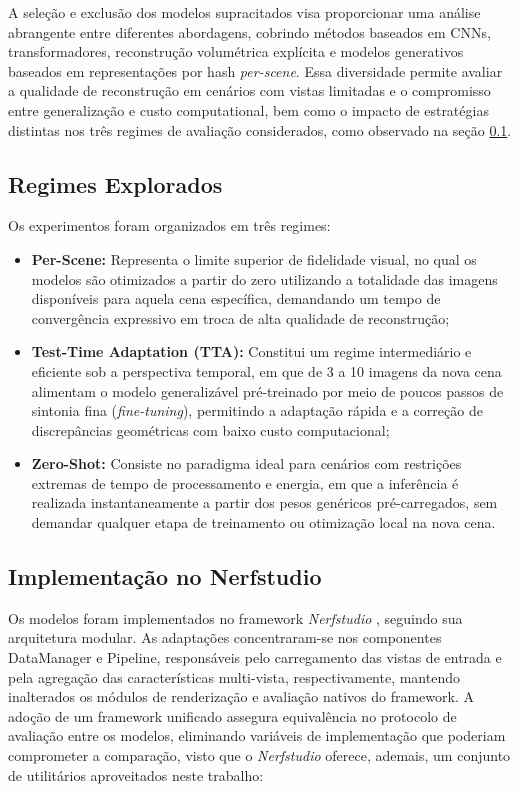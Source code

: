 \documentclass[12pt]{article}
\begin{document}
A seleção e exclusão dos modelos supracitados visa proporcionar uma análise abrangente entre diferentes abordagens, cobrindo métodos baseados em CNNs, transformadores, reconstrução volumétrica explícita e modelos generativos baseados em representações por hash \textit{per-scene}. Essa diversidade permite avaliar a qualidade de reconstrução em cenários com vistas limitadas e o compromisso entre generalização e custo computational, bem como o impacto de estratégias distintas nos três regimes de avaliação considerados, como observado na seção \ref{sec:reg}.

\subsection{Regimes Explorados}
\label{sec:reg}

Os experimentos foram organizados em três regimes: 
\begin{itemize}
  \item \textbf{Per-Scene:} Representa o limite superior de fidelidade visual, no qual os modelos são otimizados a partir do zero utilizando a totalidade das imagens disponíveis para aquela cena específica, demandando um tempo de convergência expressivo em troca de alta qualidade de reconstrução;
  \item \textbf{Test-Time Adaptation (TTA):} Constitui um regime intermediário e eficiente sob a perspectiva temporal, em que de 3 a 10 imagens da nova cena alimentam o modelo generalizável pré-treinado por meio de poucos passos de sintonia fina (\textit{fine-tuning}), permitindo a adaptação rápida e a correção de discrepâncias geométricas com baixo custo computacional;
  \item \textbf{Zero-Shot:} Consiste no paradigma ideal para cenários com restrições extremas de tempo de processamento e energia, em que a inferência é realizada instantaneamente a partir dos pesos genéricos pré-carregados, sem demandar qualquer etapa de treinamento ou otimização local na nova cena.
\end{itemize}


\subsection{Implementação no Nerfstudio}
Os modelos foram implementados no framework \textit{Nerfstudio} \cite{Tancik2023}, seguindo sua arquitetura modular. As adaptações concentraram-se nos componentes DataManager e Pipeline, responsáveis pelo carregamento das vistas de entrada e pela agregação das características multi-vista, respectivamente, mantendo inalterados os módulos de renderização e avaliação nativos do framework. A adoção de um framework unificado assegura equivalência no protocolo de avaliação entre os modelos, eliminando variáveis de implementação que poderiam comprometer a comparação, visto que o \textit{Nerfstudio} oferece, ademais, um conjunto de utilitários aproveitados neste trabalho:
\end{document}
